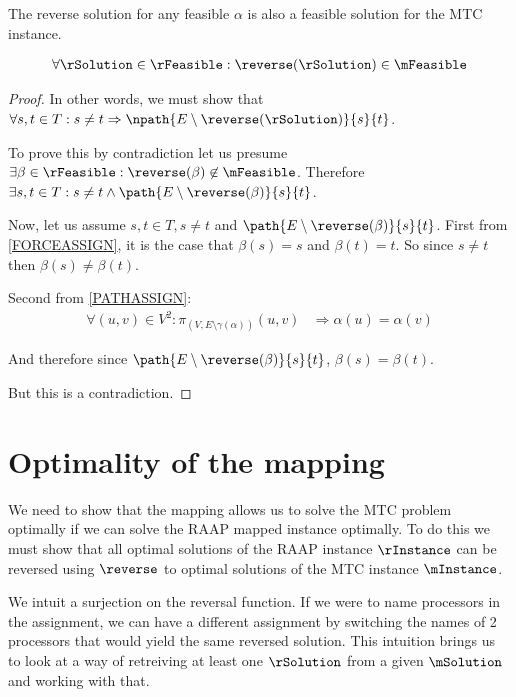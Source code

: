 \begin{lemma}
\label{REVERSEFEASABLE}
The reverse solution for any feasible $\alpha$ is also a feasible solution for the MTC instance.

\begin{align}
	\nonumber \forall \rSolution \in \rFeasible : \reverse(\rSolution) \in \mFeasible
\end{align}
\end{lemma}
\begin{proof}
In other words, we must show that $\forall s, t \in T : s \neq t \Rightarrow \npath{E \setminus \reverse(\rSolution)}{s}{t}$.

To prove this by contradiction let us presume $\exists \beta \in \rFeasible : \reverse(\beta) \not\in \mFeasible$.
Therefore $\exists s, t \in T : s \neq t \wedge \path{E \setminus \reverse(\beta)}{s}{t}$.

Now, let us assume $s, t \in T, s \neq t$ and $\path{E \setminus \reverse(\beta)}{s}{t}$.
First from \ref{FORCEASSIGN}, it is the case that $\beta(s) = s$ and $\beta(t) = t$.
So since $s \neq t$ then $\beta(s) \neq \beta(t)$.

Second from \ref{PATHASSIGN}:
\begin{align}
	\nonumber \forall (u, v) \in V^2 : \pi_{(V, E \setminus \gamma(\alpha))}(u,v) & \Rightarrow \alpha(u) = \alpha(v)
\end{align}

And therefore since $\path{E \setminus \reverse(\beta)}{s}{t}$, $\beta(s) = \beta(t)$.

But this is a contradiction.
\end{proof}

\section{Optimality of the mapping}

We need to show that the mapping allows us to solve the MTC problem optimally if we can solve the RAAP mapped instance optimally.
To do this we must show that all optimal solutions of the RAAP instance $\rInstance$ can be reversed using $\reverse$ to optimal solutions of the MTC instance $\mInstance$.

We intuit a surjection on the reversal function.
If we were to name processors in the assignment, we can have a different assignment by switching the names of 2 processors that would yield the same reversed solution.
This intuition brings us to look at a way of retreiving at least one $\rSolution$ from a given $\mSolution$ and working with that.

